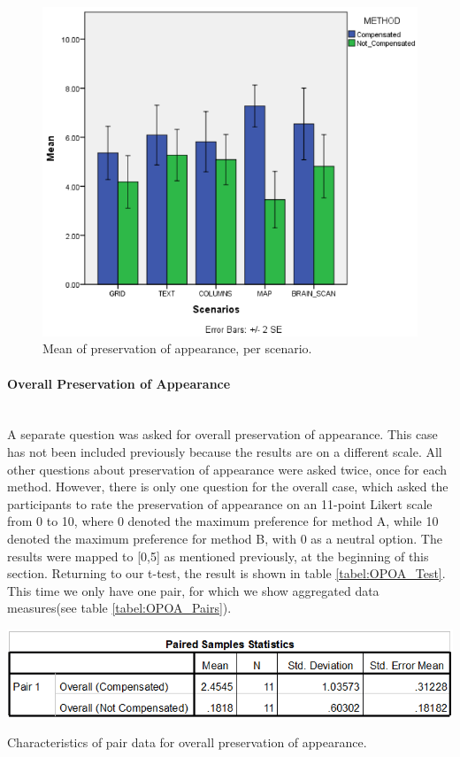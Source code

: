 \documentclass[]{article}
\begin{document}
\begin{figure}[!h]
    \centering
    \includegraphics[width=1.0\textwidth]{figures/results/POA_Graph.PNG}
    \caption{Mean of preservation of appearance, per scenario.}
    \label{fig:POA_Graph}
\end{figure}

\paragraph{Overall Preservation of Appearance}\mbox{}\\

A separate question was asked for overall preservation of appearance. This case has not been included previously because the results are on a different scale. All other questions about preservation of appearance were asked twice, once for each method. However, there is only one question for the overall case, which asked the participants to rate the preservation of appearance on an 11-point Likert scale from 0 to 10, where 0 denoted the maximum preference for method A, while 10 denoted the maximum preference for method B, with 0 as a neutral option. The results were mapped to [0,5] as mentioned previously, at the beginning of this section.  Returning to our t-test, the result is shown in table \ref{tabel:OPOA_Test}. This time we only have one pair, for which we show aggregated data measures(see table \ref{tabel:OPOA_Pairs}).


\begin{table}[!h]
  \includegraphics[width=\linewidth]{figures/results/OPOA_Pairs.PNG}
  \caption{Characteristics of pair data for overall preservation of appearance.}
  \label{tabel:OPOA_Pairs}
\end{table}
\end{document}
